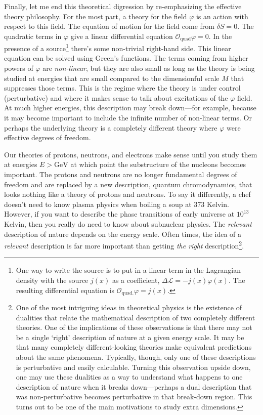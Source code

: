 Finally, let me end this theoretical digression by re-emphasizing the effective theory philosophy. For the most part, a theory for the field $\varphi$ is an action with respect to this field. The equation of motion for the field come from $\delta S = 0$. The quadratic terms in $\varphi$ give a linear differential equation $\mathcal O_\text{quad} \varphi = 0$. In the presence of a source\footnote{One way to write the source is to put in a linear term in the Lagrangian density with the source $j(x)$ as a coefficient, $\Delta\mathcal L = -j(x)\varphi(x)$. The resulting differential equation is $\mathcal O_\text{quad.}\varphi =j(x)$.} there's some non-trivial right-hand side. This linear equation can be solved using Green's functions. The terms coming from higher powers of $\varphi$ are \emph{non-linear}, but they are also small as long as the theory is being studied at energies that are small compared to the dimensionful scale $M$ that suppresses those terms. This is the regime where the theory is under control (perturbative) and where it makes sense to talk about excitations of the $\varphi$ field. At much higher energies, this description may break down---for example, because it may become important to include the infinite number of non-linear terms. Or perhaps the underlying theory is a completely different theory where $\varphi$ were effective degrees of freedom.
\begin{example}
Our theories of protons, neutrons, and electrons make sense until you study them at energies $E>\text{GeV}$ at which point the substructure of the nucleons becomes important. The protons and neutrons are no longer fundamental degrees of freedom and are replaced by a new description, quantum chromodynamics, that looks nothing like a theory of protons and neutrons. To say it differently, a chef doesn't need to know plasma physics when boiling a soup at 373 Kelvin. However, if you want to describe the phase transitions of early universe at $10^{13}$ Kelvin, then you really do need to know about subnuclear physics. The \emph{relevant} description of nature depends on the energy scale. Often times, the idea of a \emph{relevant} description is far more important than getting \emph{the right} description\footnote{One of the most intriguing ideas in theoretical physics is the existence of dualities that relate the mathematical description of two completely different theories. One of the implications of these observations is that there may not be a single `right' description of nature at a given energy scale. It may be that many completely different-looking theories make equivalent predictions about the same phenomena. Typically, though, only one of these descriptions is perturbative and easily calculable. Turning this observation upside down, one may use these dualities as a way to understand what happens to one description of nature when it breaks down---perhaps a dual description that was non-perturbative becomes perturbative in that break-down region. This turns out to be one of the main motivations to study extra dimensions.}.
\end{example}

